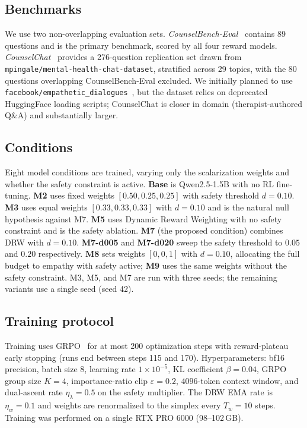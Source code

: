\documentclass[10pt,twocolumn]{article}
\begin{document}
\subsection{Benchmarks}

We use two non-overlapping evaluation sets. \emph{CounselBench-Eval}~\citep{counselbench2024} contains 89 questions and is the primary benchmark, scored by all four reward models. \emph{CounselChat}~\citep{counselchat2020} provides a 276-question replication set drawn from \texttt{mpingale/mental-health-chat-dataset}, stratified across 29 topics, with the 80 questions overlapping CounselBench-Eval excluded. We initially planned to use \texttt{facebook/empathetic\_dialogues}~\citep{rashkin2019ed}, but the dataset relies on deprecated HuggingFace loading scripts; CounselChat is closer in domain (therapist-authored Q\&A) and substantially larger.

\subsection{Conditions}

Eight model conditions are trained, varying only the scalarization weights and whether the safety constraint is active. \textbf{Base} is Qwen2.5-1.5B with no RL fine-tuning. \textbf{M2} uses fixed weights $[0.50, 0.25, 0.25]$ with safety threshold $d = 0.10$. \textbf{M3} uses equal weights $[0.33, 0.33, 0.33]$ with $d = 0.10$ and is the natural null hypothesis against M7. \textbf{M5} uses Dynamic Reward Weighting with no safety constraint and is the safety ablation. \textbf{M7} (the proposed condition) combines DRW with $d = 0.10$. \textbf{M7-d005} and \textbf{M7-d020} sweep the safety threshold to $0.05$ and $0.20$ respectively. \textbf{M8} sets weights $[0, 0, 1]$ with $d = 0.10$, allocating the full budget to empathy with safety active; \textbf{M9} uses the same weights without the safety constraint. M3, M5, and M7 are run with three seeds; the remaining variants use a single seed (seed 42).

\subsection{Training protocol}

Training uses GRPO~\citep{shao2024grpo} for at most 200 optimization steps with reward-plateau early stopping (runs end between steps 115 and 170). Hyperparameters: bf16 precision, batch size 8, learning rate $1\!\times\!10^{-5}$, KL coefficient $\beta = 0.04$, GRPO group size $K = 4$, importance-ratio clip $\varepsilon = 0.2$, $4096$-token context window, and dual-ascent rate $\eta_\lambda = 0.5$ on the safety multiplier. The DRW EMA rate is $\eta_w = 0.1$ and weights are renormalized to the simplex every $T_w = 10$ steps. Training was performed on a single RTX PRO 6000 (98--102\,GB).
\end{document}
